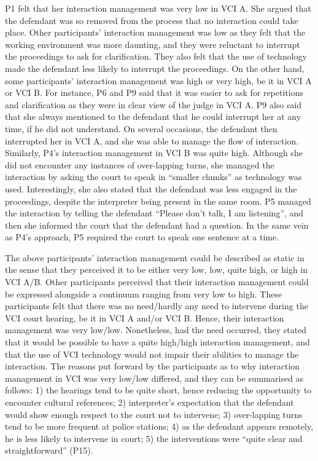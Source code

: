 \documentclass[output=paper]{langsci/langscibook}
\begin{document}
P1 felt that her interaction management was very low in \textsc{VCI} A. She argued that the defendant was so removed from the process that no interaction could take place. Other participants’ interaction management was low as they felt that the working environment was more daunting, and they were reluctant to interrupt the proceedings to ask for clarification. They also felt that the use of technology made the defendant less likely to interrupt the proceedings. On the other hand, some participants’ interaction management was high or very high, be it in \textsc{VCI} A or \textsc{VCI} B. For instance, P6 and P9 said that it was easier to ask for repetitions and clarification as they were in clear view of the judge in \textsc{VCI} A. P9 also said that she always mentioned to the defendant that he could interrupt her at any time, if he did not understand. On several occasions, the defendant then interrupted her in \textsc{VCI} A, and she was able to manage the flow of interaction. Similarly, P4’s interaction management in \textsc{VCI} B was quite high. Although she did not encounter any instances of over-lapping turns, she managed the interaction by asking the court to speak in “smaller chunks” as technology was used. Interestingly, she also stated that the defendant was less engaged in the proceedings, despite the interpreter being present in the same room. P5 managed the interaction by telling the defendant “Please don’t talk, I am listening”, and then she informed the court that the defendant had a question. In the same vein as P4’s approach, P5 required the court to speak one sentence at a time. 

The above participants’ interaction management could be described as static in the sense that they perceived it to be either very low, low, quite high, or high in \textsc{VCI} A/B. Other participants perceived that their interaction management could be expressed alongside a continuum ranging from very low to high. These participants felt that there was no need/hardly any need to intervene during the \textsc{VCI} court hearing, be it in \textsc{VCI} A and/or \textsc{VCI} B. Hence, their interaction management was very low/low. Nonetheless, had the need occurred, they stated that it would be possible to have a quite high/high interaction management, and that the use of \textsc{VCI} technology would not impair their abilities to manage the interaction. The reasons put forward by the participants as to why interaction management in \textsc{VCI} was very low/low differed, and they can be summarised as follows: 1) the hearings tend to be quite short, hence reducing the opportunity to encounter cultural references; 2) interpreter’s expectation that the defendant would show enough respect to the court not to intervene; 3) over-lapping turns tend to be more frequent at police stations; 4) as the defendant appears remotely, he is less likely to intervene in court; 5) the interventions were “quite clear and straightforward” (P15).
\end{document}
